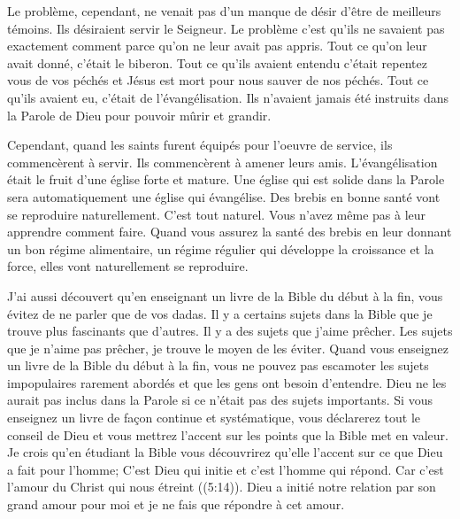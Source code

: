 Le problème, cependant, ne venait pas d’un manque de désir d’être de meilleurs témoins. Ils désiraient servir le
Seigneur. Le problème c’est qu’ils ne savaient pas exactement comment parce qu’on ne leur avait pas appris. Tout ce
qu’on leur avait donné, c’était le biberon. Tout ce qu’ils avaient entendu c’était \og repentez vous de vos péchés \fg{} et
\og Jésus est mort pour nous sauver de nos péchés. \fg{} Tout ce qu’ils avaient eu, c’était de l’évangélisation. Ils n’avaient
jamais été instruits dans la Parole de Dieu pour pouvoir mûrir et grandir.

Cependant, quand les saints furent équipés pour l’oeuvre de service, ils commencèrent à servir. Ils commencèrent à
amener leurs amis. L’évangélisation était le fruit d’une église forte et mature. Une église qui est solide dans la Parole
sera automatiquement une église qui évangélise. Des brebis en bonne santé vont se reproduire naturellement. C’est
tout naturel. Vous n’avez même pas à leur apprendre comment faire. Quand vous assurez la santé des brebis en leur
donnant un bon régime alimentaire, un régime régulier qui développe la croissance et la force, elles vont
naturellement se reproduire.

J’ai aussi découvert qu’en enseignant un livre de la Bible du début à la fin, vous évitez de ne parler que de vos
dadas. Il y a certains sujets dans la Bible que je trouve plus fascinants que d’autres. Il y a des sujets que j’aime
prêcher. Les sujets que je n’aime pas prêcher, je trouve le moyen de les éviter. Quand vous enseignez un livre de la
Bible du début à la fin, vous ne pouvez pas escamoter les sujets impopulaires rarement abordés et que les gens ont
besoin d’entendre. Dieu ne les aurait pas inclus dans la Parole si ce n’était pas des sujets importants. Si vous
enseignez un livre de façon continue et systématique, vous déclarerez tout le conseil de Dieu et vous mettrez l’accent
sur les points que la Bible met en valeur. Je crois qu’en étudiant la Bible vous découvrirez qu'elle l'accent sur ce que
Dieu a fait pour l’homme; C'est Dieu qui initie et c'est l'homme qui répond. Car c’est l’amour du Christ qui nous étreint
((5:14)). Dieu a initié notre relation par son grand amour pour moi et je ne fais que répondre à cet
amour.

